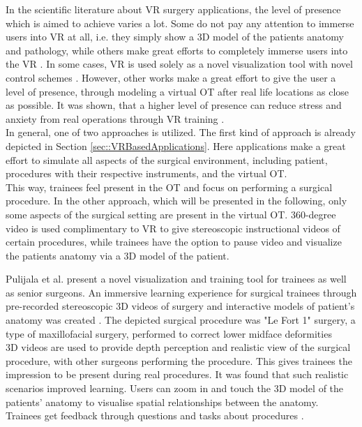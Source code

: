 In the scientific literature about VR surgery applications, the level of presence which is aimed to achieve varies a lot.
Some do not pay any attention to immerse users into VR at all, i.e. they simply show a 3D model of the patients anatomy and 
pathology, while others make great efforts to completely immerse users into the VR \cite{Vaughan.2016}.
In some cases, VR is used solely as a novel visualization tool with novel control schemes \cite{.2017}.
However, other works make a great effort to give the user a level of presence, through modeling a virtual OT after real life locations as close as possible.
It was shown, that a higher level of presence can reduce stress and anxiety from real operations through VR training \cite{Pulijala.2017,Pulijala.2018,Pulijala.2018b}.
\\ In general, one of two approaches is utilized.
The first kind of approach is already depicted in Section \ref{sec::VRBasedApplications}.
Here applications make a great effort to simulate all aspects of the surgical environment, including patient, procedures with their respective instruments, and the virtual OT.
\\ This way, trainees feel present in the OT and focus on performing a surgical procedure.
In the other approach, which will be presented in the following, only some aspects of the surgical setting are present in the virtual OT.
360-degree video is used complimentary to VR to give stereoscopic instructional videos of certain procedures, while trainees have the option to pause video 
and visualize the patients anatomy via a 3D model of the patient.

Pulijala et al. \cite{Pulijala.2017} present a novel visualization and training tool for trainees as well as senior surgeons.
An immersive learning experience for surgical trainees through pre-recorded stereoscopic 3D videos of surgery and interactive models of patient’s anatomy was created \cite{Pulijala.2017}.
The depicted surgical procedure was "Le Fort 1" surgery, a type of maxillofacial surgery, performed to correct lower midface deformities \cite{Pulijala.2017}
\\ 3D videos are used to provide depth perception and realistic view of the surgical procedure, with other surgeons performing the procedure.
This gives trainees the impression to be present during real procedures.
It was found that such realistic scenarios improved learning.
Users can zoom in and touch the 3D model of the patients' anatomy to visualise spatial relationships between the anatomy.
Trainees get feedback through questions and tasks about procedures \cite{Pulijala.2017,Pulijala.2018}.

